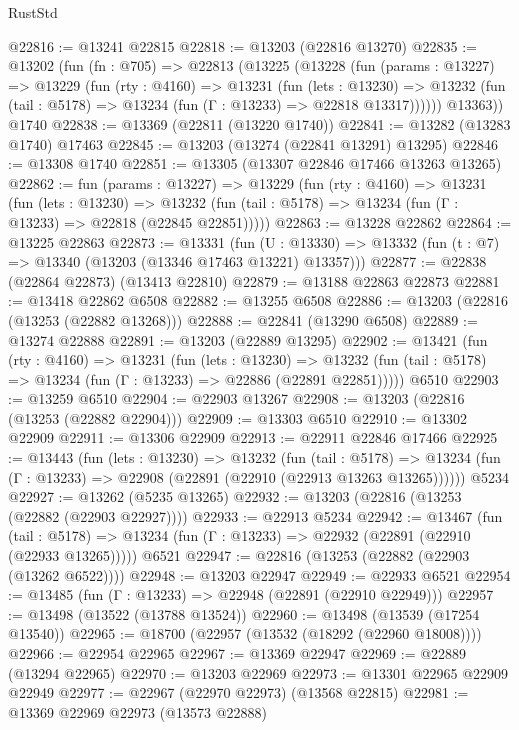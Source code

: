 \begin{lexlean}{RustStd}
\begin{coremodule}
@22816 := @13241 @22815
@22818 := @13203 (@22816 @13270)
@22835 := @13202
    (fun (fn : @705) =>
    @22813
      (@13225
        (@13228
          (fun (params : @13227) =>
          @13229
            (fun (rty : @4160) =>
            @13231
              (fun (lets : @13230) =>
              @13232 (fun (tail : @5178) => @13234 (fun (Γ : @13233) => @22818 @13317))))))
        @13363))
    @1740
@22838 := @13369 (@22811 (@13220 @1740))
@22841 := @13282 (@13283 @1740) @17463
@22845 := @13203 (@13274 (@22841 @13291) @13295)
@22846 := @13308 @1740
@22851 := @13305 (@13307 @22846 @17466 @13263 @13265)
@22862 := fun (params : @13227) =>
  @13229
    (fun (rty : @4160) =>
    @13231
      (fun (lets : @13230) =>
      @13232 (fun (tail : @5178) => @13234 (fun (Γ : @13233) => @22818 (@22845 @22851)))))
@22863 := @13228 @22862
@22864 := @13225 @22863
@22873 := @13331
    (fun (U : @13330) => @13332 (fun (t : @7) => @13340 (@13203 (@13346 @17463 @13221) @13357)))
@22877 := @22838 (@22864 @22873) (@13413 @22810)
@22879 := @13188 @22863 @22873
@22881 := @13418 @22862 @6508
@22882 := @13255 @6508
@22886 := @13203 (@22816 (@13253 (@22882 @13268)))
@22888 := @22841 (@13290 @6508)
@22889 := @13274 @22888
@22891 := @13203 (@22889 @13295)
@22902 := @13421
    (fun (rty : @4160) =>
    @13231
      (fun (lets : @13230) =>
      @13232 (fun (tail : @5178) => @13234 (fun (Γ : @13233) => @22886 (@22891 @22851)))))
    @6510
@22903 := @13259 @6510
@22904 := @22903 @13267
@22908 := @13203 (@22816 (@13253 (@22882 @22904)))
@22909 := @13303 @6510
@22910 := @13302 @22909
@22911 := @13306 @22909
@22913 := @22911 @22846 @17466
@22925 := @13443
    (fun (lets : @13230) =>
    @13232
      (fun (tail : @5178) =>
      @13234 (fun (Γ : @13233) => @22908 (@22891 (@22910 (@22913 @13263 @13265))))))
    @5234
@22927 := @13262 (@5235 @13265)
@22932 := @13203 (@22816 (@13253 (@22882 (@22903 @22927))))
@22933 := @22913 @5234
@22942 := @13467
    (fun (tail : @5178) => @13234 (fun (Γ : @13233) => @22932 (@22891 (@22910 (@22933 @13265)))))
    @6521
@22947 := @22816 (@13253 (@22882 (@22903 (@13262 @6522))))
@22948 := @13203 @22947
@22949 := @22933 @6521
@22954 := @13485 (fun (Γ : @13233) => @22948 (@22891 (@22910 @22949)))
@22957 := @13498 (@13522 (@13788 @13524))
@22960 := @13498 (@13539 (@17254 @13540))
@22965 := @18700 (@22957 (@13532 (@18292 (@22960 @18008))))
@22966 := @22954 @22965
@22967 := @13369 @22947
@22969 := @22889 (@13294 @22965)
@22970 := @13203 @22969
@22973 := @13301 @22965 @22909 @22949
@22977 := @22967 (@22970 @22973) (@13568 @22815)
@22981 := @13369 @22969 @22973 (@13573 @22888)

\end{coremodule}
\end{lexlean}
